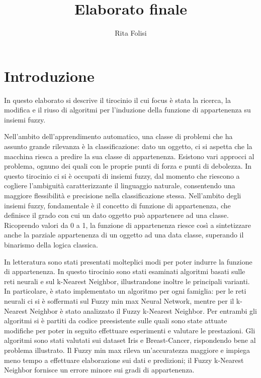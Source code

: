\documentclass[11pt,  oneside, openany]{book}
\title{Elaborato finale}
\date{}
\author{Rita Folisi}
\begin{document}

  \begin{titlepage}
    
    \tableofcontents
    \thispagestyle{empty}
  \end{titlepage}




	\chapter*{Introduzione}
In questo elaborato si descrive il tirocinio il cui focus è stata la ricerca, la modifica e il riuso di algoritmi per l'induzione della funzione di appartenenza su insiemi fuzzy. 

Nell'ambito dell'apprendimento automatico, una classe di problemi che ha assunto grande rilevanza è la classificazione: dato un oggetto, ci si aspetta che la macchina riesca a predire la sua classe di appartenenza. Esistono vari approcci al problema, ognuno dei quali con le proprie punti di forza e punti di debolezza. In questo tirocinio ci si è occupati di insiemi fuzzy, dal momento che riescono a cogliere l'ambiguità caratterizzante il linguaggio naturale, consentendo una maggiore flessibilità e precisione nella classificazione stessa. Nell'ambito degli insiemi fuzzy, fondamentale è il concetto di funzione di appartenenza, che definisce il grado con cui un dato oggetto può appartenere ad una classe. Ricoprendo valori da 0 a 1, la funzione di appartenenza riesce così a sintetizzare anche la parziale appartenenza di un oggetto ad una data classe, superando il binarismo della logica classica. 

In letteratura sono stati presentati molteplici modi per poter indurre la funzione di appartenenza. In questo tirocinio sono stati esaminati algoritmi basati sulle reti neurali e sul k-Nearest Neighbor, illustrandone inoltre le principali varianti. In particolare, è stato implementato un algoritmo per ogni famiglia: per le reti neurali ci si è soffermati sul Fuzzy min max Neural Network, mentre per il k-Nearest Neighbor è stato analizzato il Fuzzy k-Nearest Neighbor. Per entrambi gli algoritmi si è partiti da codice preesistente sulle quali sono state attuate modifiche per poter in seguito effettuare esperimenti e valutare le prestazioni. Gli algoritmi sono stati valutati sui dataset Iris e Breast-Cancer, rispondendo bene al problema illustrato. Il Fuzzy min max rileva un'accuratezza maggiore e impiega meno tempo a effettuare elaborazione sui dati e predizioni; il Fuzzy k-Nearest Neighbor fornisce un errore minore sui gradi di appartenenza. 
\end{document}
